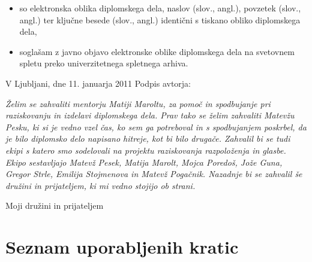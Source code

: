\documentclass[a4paper, 12pt]{book}
\newcommand{\clearemptydoublepage}{\newpage{\pagestyle{empty}\cleardoublepage}}
\begin{document}
{\begin{itemize}
	\item	so elektronska oblika diplomskega dela, naslov (slov., angl.), povzetek (slov., angl.) ter ključne besede (slov., angl.) identični s tiskano obliko diplomskega dela,
	\item soglašam z javno objavo elektronske oblike diplomskega dela na svetovnem spletu preko univerzitetnega spletnega arhiva.	
\end{itemize}

\vspace{1cm}
\noindent V Ljubljani, dne 11. januarja 2011 \hfill Podpis avtorja:

\clearemptydoublepage

\thispagestyle{empty}\mbox{}\vfill\null\it%
Želim se zahvaliti mentorju Matiji Maroltu, za pomoč in spodbujanje pri raziskovanju in izdelavi diplomskega dela. Prav tako se želim zahvaliti Matevžu Pesku, ki si je vedno vzel čas, ko sem ga potreboval in s spodbujanjem poskrbel, da je bilo diplomsko delo napisano hitreje, kot bi bilo drugače. Zahvalil bi se tudi ekipi s katero smo sodelovali na projektu raziskovanja razpoloženja in glasbe. Ekipo sestavljajo Matevž Pesek, Matija Marolt, Mojca Poredoš, Jože Guna, Gregor Strle, Emilija Stojmenova in Matevž Pogačnik. Nazadnje bi se zahvalil še družini in prijateljem, ki mi vedno stojijo ob strani. 
\rm\normalfont

\clearemptydoublepage

\thispagestyle{empty}\mbox{}{\textheight}\mbox{}\hfill\begin{minipage}{0.55\textwidth}%
Moji družini in prijateljem
\normalfont\end{minipage}

\clearemptydoublepage

\def\thepage{}%
\tableofcontents{}


\clearemptydoublepage


\chapter*{Seznam uporabljenih kratic}

}
\end{document}
